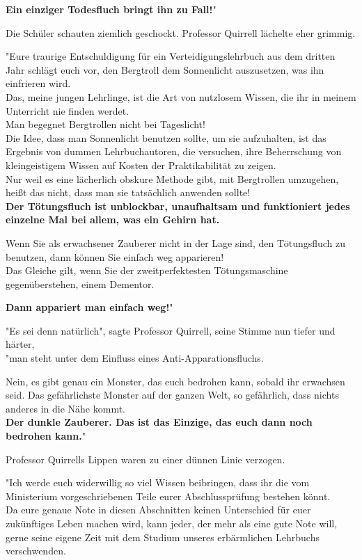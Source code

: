 {\textbf{Ein einziger Todesfluch bringt ihn zu Fall!}"

Die Schüler schauten ziemlich geschockt. Professor Quirrell lächelte eher grimmig.

"Eure traurige Entschuldigung für ein Verteidigungslehrbuch aus dem dritten Jahr schlägt euch vor, den Bergtroll dem Sonnenlicht auszusetzen, was ihn einfrieren wird.\\ Das, meine jungen Lehrlinge, ist die Art von nutzlosem Wissen, die ihr in meinem Unterricht nie finden werdet.\\ Man begegnet Bergtrollen nicht bei Tageslicht!\\ Die Idee, dass man Sonnenlicht benutzen sollte, um sie aufzuhalten, ist das Ergebnis von dummen Lehrbuchautoren, die versuchen, ihre Beherrschung von kleingeistigem Wissen auf Kosten der Praktikabilität zu zeigen.\\ Nur weil es eine lächerlich obskure Methode gibt, mit Bergtrollen umzugehen, heißt das nicht, dass man sie tatsächlich anwenden sollte!\\

\textbf{Der Tötungsfluch ist unblockbar, unaufhaltsam und funktioniert jedes einzelne Mal bei allem, was ein Gehirn hat.}

Wenn Sie als erwachsener Zauberer nicht in der Lage sind, den Tötungsfluch zu benutzen, dann können Sie einfach weg apparieren!\\ Das Gleiche gilt, wenn Sie der zweitperfektesten Tötungsmaschine gegenüberstehen, einem Dementor.

\textbf{Dann appariert man einfach weg!}"

"Es sei denn natürlich", sagte Professor Quirrell, seine Stimme nun tiefer und härter,\\ "man steht unter dem Einfluss eines Anti-Apparationsfluchs.

Nein, es gibt genau ein Monster, das euch bedrohen kann, sobald ihr erwachsen seid. Das gefährlichste Monster auf der ganzen Welt, so gefährlich, dass nichts anderes in die Nähe kommt.\\ \textbf{\hfill\break Der dunkle Zauberer. Das ist das Einzige, das euch dann noch bedrohen kann.}"

Professor Quirrells Lippen waren zu einer dünnen Linie verzogen.

"Ich werde euch widerwillig so viel Wissen beibringen, dass ihr die vom Ministerium vorgeschriebenen Teile eurer Abschlussprüfung bestehen könnt.\\ Da eure genaue Note in diesen Abschnitten keinen Unterschied für euer zukünftiges Leben machen wird, kann jeder, der mehr als eine gute Note will, gerne seine eigene Zeit mit dem Studium unseres erbärmlichen Lehrbuchs verschwenden.

}
